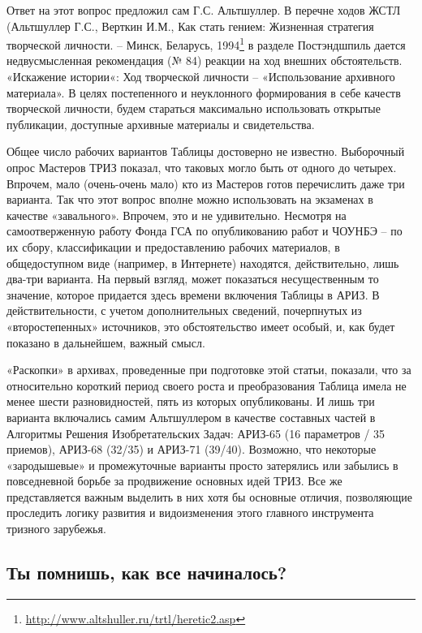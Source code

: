 \documentclass[11pt,a4paper]{article}
\begin{document}
Ответ на этот вопрос предложил сам Г.С. Альтшуллер. В перечне ходов ЖСТЛ
(Альтшуллер Г.С., Верткин И.М., Как стать гением: Жизненная стратегия
творческой личности. -- Минск, Беларусь,
1994\footnote{\url{http://www.altshuller.ru/trtl/heretic2.asp}} в разделе
Постэндшпиль дается недвусмысленная рекомендация (№ 84) реакции на ход внешних
обстоятельств. «Искажение истории«: Ход творческой личности -- «Использование
архивного материала». В целях постепенного и неуклонного формирования в себе
качеств творческой личности, будем стараться максимально использовать открытые
публикации, доступные архивные материалы и свидетельства.

Общее число рабочих вариантов Таблицы достоверно не известно. Выборочный опрос
Мастеров ТРИЗ показал, что таковых могло быть от одного до четырех. Впрочем,
мало (очень-очень мало) кто из Мастеров готов перечислить даже три
варианта. Так что этот вопрос вполне можно использовать на экзаменах в
качестве «завального». Впрочем, это и не удивительно. Несмотря на
самоотверженную работу Фонда ГСА по опубликованию работ и ЧОУНБЭ -- по их
сбору, классификации и предоставлению рабочих материалов, в общедоступном виде
(например, в Интернете) находятся, действительно, лишь два-три варианта. На
первый взгляд, может показаться несущественным то значение, которое придается
здесь времени включения Таблицы в АРИЗ. В действительности, с учетом
дополнительных сведений, почерпнутых из «второстепенных» источников, это
обстоятельство имеет особый, и, как будет показано в дальнейшем, важный смысл.

«Раскопки» в архивах, проведенные при подготовке этой статьи, показали, что за
относительно короткий период своего роста и преобразования Таблица имела не
менее шести разновидностей, пять из которых опубликованы. И лишь три варианта
включались самим Альтшуллером в качестве составных частей в Алгоритмы Решения
Изобретательских Задач: АРИЗ-65 (16 параметров / 35 приемов), АРИЗ-68 (32/35)
и АРИЗ-71 (39/40). Возможно, что некоторые «зародышевые» и промежуточные
варианты просто затерялись или забылись в повседневной борьбе за продвижение
основных идей ТРИЗ. Все же представляется важным выделить в них хотя бы
основные отличия, позволяющие проследить логику развития и видоизменения этого
главного инструмента тризного зарубежья.

\subsection*{Ты помнишь, как все начиналось?}
\end{document}
